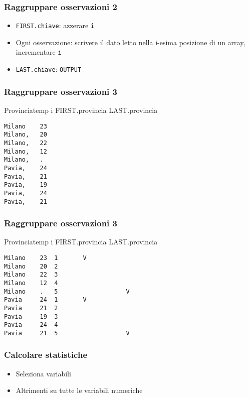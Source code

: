 \begin{frame}\frametitle{Raggruppare osservazioni 2}
  \begin{itemize}
  \item
    \texttt{FIRST.chiave}: azzerare  \texttt{i}
  \item
    Ogni osservazione: scrivere il dato letto nella i-esima posizione di un array,
    incrementare  \texttt{i}
  \item
    \texttt{LAST.chiave}: \texttt{OUTPUT}
  \end{itemize}\end{frame}


\begin{frame}[containsverbatim]\frametitle{Raggruppare osservazioni 3}
  \small
  Provincia\hspace{2ex}temp\hspace{1ex} i\hspace{1ex} FIRST.provincia\hspace{1ex} LAST.provincia
\begin{verbatim}
Milano    23
Milano,   20
Milano,   22
Milano,   12
Milano,   .
Pavia,    24
Pavia,    21
Pavia,    19
Pavia,    24
Pavia,    21
\end{verbatim}
\end{frame}

\begin{frame}[containsverbatim]\frametitle{Raggruppare osservazioni 3}
  \small
  Provincia\hspace{2ex}temp\hspace{1ex} i\hspace{1ex} FIRST.provincia\hspace{1ex} LAST.provincia
\begin{verbatim}
Milano    23  1       V
Milano    20  2
Milano    22  3
Milano    12  4
Milano    .   5                   V
Pavia     24  1       V
Pavia     21  2
Pavia     19  3
Pavia     24  4
Pavia     21  5                   V
\end{verbatim}
\end{frame}


\begin{frame}[containsverbatim]\frametitle{Calcolare statistiche}
  \begin{itemize}
  \item
    Seleziona variabili
  \item
    Altrimenti su tutte le variabili numeriche
  \end{itemize}
\end{frame}



